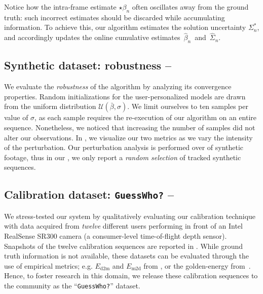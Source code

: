 Notice how the intra-frame estimate {\small $\star\beta_n$} often oscillates away from the ground truth: 
such incorrect estimates should be discarded while accumulating information. To achieve this, our algorithm estimates the solution uncertainty {\small $\Sigma^*_n$}, and accordingly updates the online cumulative estimates~{\small $\hat\beta_n$}~and~{\small $\hat\Sigma_n$}.

\subsection{Synthetic dataset: robustness -- }
\label{sec:evalsynth}
We evaluate the \emph{robustness} of the algorithm by analyzing its convergence properties. Random initializations for the user-personalized models are drawn from the uniform distribution {\small $\mathcal{U}(\bar\beta, \sigma)$}.
We limit ourselves to ten samples per value of $\sigma$, as each sample requires the re-execution of our algorithm on an entire sequence. Nonetheless, we noticed that increasing the number of samples did not alter our observations.
In , we visualize our two metrics as we vary the intensity of the perturbation. Our perturbation analysis is performed over  of synthetic footage, thus in our \VideoSynth{}, we only report a \emph{random selection} of tracked synthetic sequences.
% 

\subsection{Calibration dataset: \texttt{GuessWho?} -- }
\label{sec:evaldataset}
We stress-tested our system by qualitatively evaluating our calibration technique with data acquired from \emph{twelve} different users performing in front of an Intel RealSense SR300 camera (a consumer-level time-of-flight depth sensor). Snapshots of the twelve calibration sequences are reported in .
While ground truth information is not available, these datasets can be evaluated through the use of empirical metrics; e.g. $E_\text{d2m}$ and $E_\text{m2d}$ from \cite{tkach2016sphere}, or the golden-energy from~\cite{taylor2016joint}.
Hence, to foster research in this domain, we release these calibration sequences to the community as the ``\texttt{GuessWho?}'' dataset.

